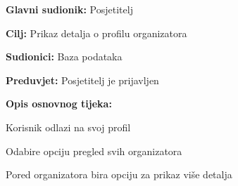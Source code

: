 				\noindent {}
				\begin{packed_item}
					
					\item \textbf{Glavni sudionik: }Posjetitelj
					\item  \textbf{Cilj:} Prikaz detalja o profilu organizatora
					\item  \textbf{Sudionici:} Baza podataka
					\item  \textbf{Preduvjet:} Posjetitelj je prijavljen
					\item  \textbf{Opis osnovnog tijeka:}
					
					\item[] \begin{packed_enum}
						\item Korisnik odlazi na svoj profil
						\item Odabire opciju pregled svih organizatora
						\item Pored organizatora bira opciju za prikaz više detalja
					\end{packed_enum}
				\end{packed_item}
				
